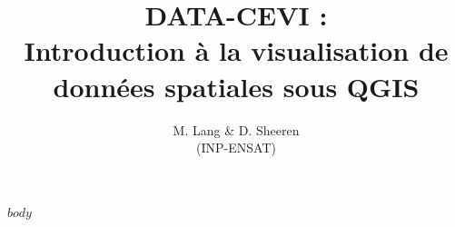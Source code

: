 \documentclass[12]{scrartcl}
\begin{document}
\title{DATA-CEVI :\\ Introduction à la visualisation de données spatiales sous QGIS}
\date{}
\author{M. Lang \& D. Sheeren \\(INP-ENSAT)}
\maketitle
\tableofcontents
\pagebreak

$body$
\end{document}
